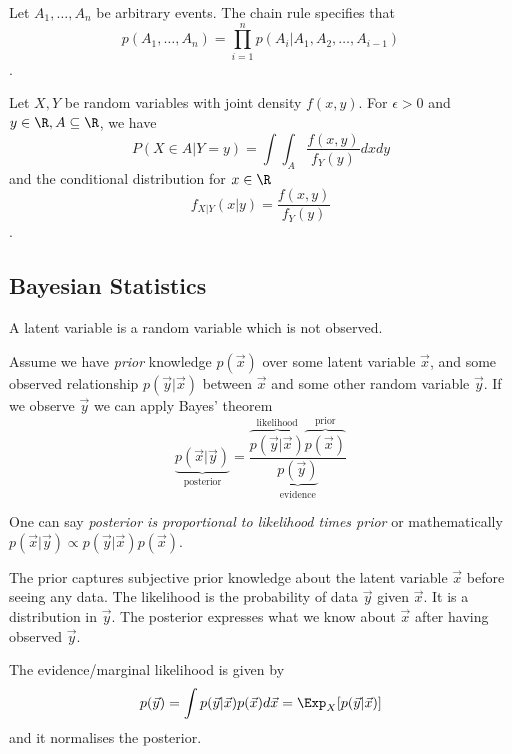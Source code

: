 Let $A_1, \dotsc, A_n$ be arbitrary events.
The chain rule specifies that
\begin{equation*}
    p(A_1, \dotsc, A_n)
    = \prod_{i=1}^n{p(A_i | A_1, A_2, \dotsc, A_{i - 1})}
\end{equation*}.

Let $X, Y$ be random variables with joint density $f(x, y)$.
For $\epsilon > 0$ and $y \in \R, A \subseteq \R$, we have
\begin{equation*}
    P(X \in A | Y = y) = \int{\int_A{\frac{f(x, y)}{f_Y(y)}dx}dy}
\end{equation*}
and the conditional distribution for $x \in \R$
\begin{equation*}
    f_{X | Y}(x | y) = \frac{f(x, y)}{f_Y(y)}
\end{equation*}.


\subsection{Bayesian Statistics}
A latent variable is a random variable which is not observed.

Assume we have \emph{prior} knowledge $p(\vec{x})$
over some latent variable $\vec{x}$,
and some observed relationship $p(\vec{y} | \vec{x})$ between
$\vec{x}$ and some other random variable $\vec{y}$.
If we observe $\vec{y}$ we can apply Bayes' theorem
\begin{equation*}
    \underbrace{p(\vec{x} | \vec{y})}_\text{posterior} = \frac{
        \overbrace{p(\vec{y} | \vec{x})}^\text{likelihood}
        \overbrace{p(\vec{x})}^\text{prior}
    }{
        \underbrace{p(\vec{y})}_\text{evidence}
    }
\end{equation*}

One can say
\emph{posterior is proportional to likelihood times prior} or
mathematically $p(\vec{x} | \vec{y}) \propto p(\vec{y} | \vec{x}) p(\vec{x})$.

The prior captures subjective prior knowledge about the latent
variable $\vec{x}$ before seeing any data.
The likelihood is the probability of data $\vec{y}$ given
$\vec{x}$. It is a distribution in $\vec{y}$.
The posterior expresses what we know about $\vec{x}$ after
having observed $\vec{y}$.

The evidence/marginal likelihood is given by
\begin{equation*}
    p(\vec{y})
    = \int{p(\vec{y} | \vec{x}) p(\vec{x}) d\vec{x}}
    = \Exp_X[p(\vec{y} | \vec{x})]
\end{equation*}
and it normalises the posterior.


